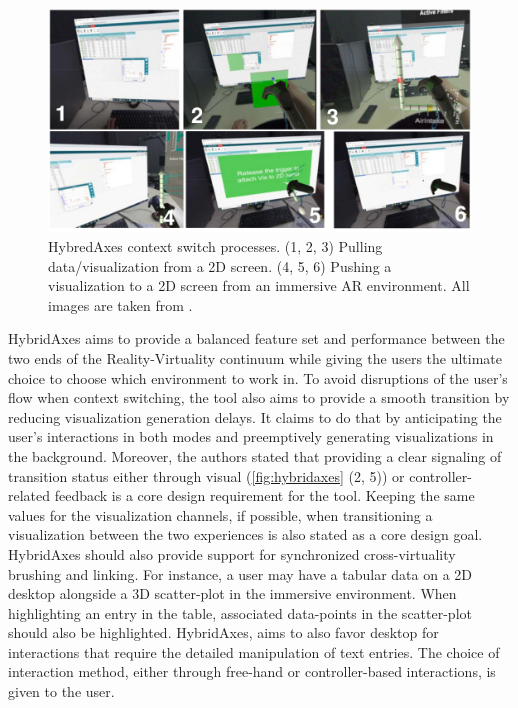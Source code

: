 \documentclass{vgtc}                          %
\begin{document}
\begin{figure}[tb]
	\centering
	\includegraphics[width=\columnwidth]{hybridaxes}
	\caption[Caption for RagRug]{HybredAxes context switch processes. (1, 2, 3)
		Pulling data/visualization from a 2D screen. (4, 5, 6) Pushing a
        visualization to a 2D screen from an immersive AR environment. All images are taken from \cite{hybridaxes_tool}. }
	\label{fig:hybridaxes}
\end{figure}

\noindent HybridAxes aims to provide a balanced feature set and performance
between the two ends of the Reality-Virtuality continuum while giving the users
the ultimate choice to choose which environment to work in. To avoid
disruptions of the user's flow when context switching, the tool also aims to
provide a smooth transition by reducing visualization generation delays. It
claims to do that by anticipating the user's interactions in both modes and
preemptively generating
visualizations in the background. Moreover, the authors stated that providing
a clear signaling of transition status either through visual (\autoref{fig:hybridaxes} (2, 5)) or
controller-related feedback is a core design requirement for the tool.
Keeping the same values for the visualization channels, if possible, when
transitioning a visualization between the two experiences is also stated as
a core design goal. HybridAxes should also provide support for synchronized
cross-virtuality brushing and linking. For instance, a user may have a tabular
data on a 2D desktop alongside a 3D scatter-plot in the immersive environment.
When highlighting an entry in the table, associated data-points in the
scatter-plot should also be highlighted. HybridAxes, aims to also favor desktop
for interactions that require the detailed manipulation of text entries. The
choice of interaction method, either through free-hand or
controller-based interactions, is given to the user.
\end{document}
